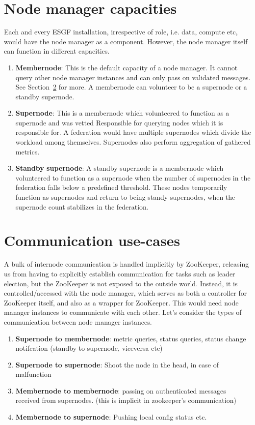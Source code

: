 \documentclass[oneside,12pt]{memoir}
\begin{document}
\section{Node manager capacities}
Each and every ESGF installation, irrespective of role, i.e. data, compute etc, would have the node manager as a component.  However, the node manager itself can function in different capacities. 
\begin{enumerate}
\item \textbf{Membernode}: This is the default capacity of a node manager. It cannot query other node manager instances and can only pass on validated messages. See Section~\ref{commcases} for more. A membernode can volunteer to be a supernode or a standby supernode.
\item \textbf{Supernode}: This is a membernode which volunteered to function as a supernode and was vetted Responsible for querying nodes which it is responsible for.  A federation would have multiple supernodes which divide the workload among themselves. Supernodes also perform aggregation of gathered metrics. 
\item \textbf{Standby supernode}: A standby supernode is a membernode which volunteered to function as a supernode when the number of supernodes in the federation falls below a predefined threshold. These nodes temporarily function as supernodes and return to being standy supernodes, when the supernode count stabilizes in the federation.
\end{enumerate}

\section{Communication use-cases}
\label{commcases}
A bulk of internode communication is handled implicitly by ZooKeeper, releasing us from having to explicitly establish communication for tasks such as leader election, but the ZooKeeper is not exposed to the outside world. Instead, it is controlled/accessed with the node manager, which serves as both a controller for ZooKeeper itself, and also as a wrapper for ZooKeeper. This would need node manager instances to communicate with each other. Let's consider the types of communication between node manager instances.
\begin{enumerate}
\item \textbf{Supernode to membernode}: metric queries, status queries, status change notifcation (standby to supernode, viceversa etc)
\item \textbf{Supernode to supernode}: Shoot the node in the head, in case of malfunction
\item \textbf{Membernode to membernode}: passing on authenticated messages received from supernodes.  (this is implicit in zookeeper's communication) 
\item \textbf{Membernode to supernode}: Pushing local config status etc.
\end{enumerate}
\end{document}
